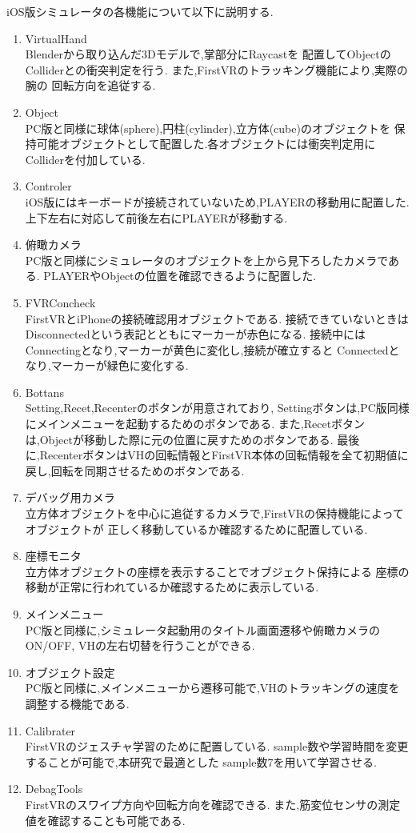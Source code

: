 \documentclass{ltjsreport}
\begin{document}
		iOS版シミュレータの各機能について以下に説明する.
		\begin{enumerate}
			\item VirtualHand\\
				Blenderから取り込んだ3Dモデルで,掌部分にRaycastを
				配置してObjectのColliderとの衝突判定を行う.
				また,FirstVRのトラッキング機能により,実際の腕の
				回転方向を追従する.
			\item Object\\
				PC版と同様に球体(sphere),円柱(cylinder),立方体(cube)のオブジェクトを
				保持可能オブジェクトとして配置した.各オブジェクトには衝突判定用にColliderを付加している.
			\item Controler\\
				iOS版にはキーボードが接続されていないため,PLAYERの移動用に配置した.
				上下左右に対応して前後左右にPLAYERが移動する.
			\item 俯瞰カメラ\\
				PC版と同様にシミュレータのオブジェクトを上から見下ろしたカメラである.
				PLAYERやObjectの位置を確認できるように配置した.
			\item FVRConcheck\\
				FirstVRとiPhoneの接続確認用オブジェクトである.
				接続できていないときはDisconnectedという表記とともにマーカーが赤色になる.
				接続中にはConnectingとなり,マーカーが黄色に変化し,接続が確立すると
				Connectedとなり,マーカーが緑色に変化する.
			\item Bottans\\
				Setting,Recet,Recenterのボタンが用意されており,
				Settingボタンは,PC版同様にメインメニューを起動するためのボタンである.
				また,Recetボタンは,Objectが移動した際に元の位置に戻すためのボタンである.
				最後に,RecenterボタンはVHの回転情報とFirstVR本体の回転情報を全て初期値に戻し,回転を同期させるためのボタンである.
			\item デバッグ用カメラ\\
				立方体オブジェクトを中心に追従するカメラで,FirstVRの保持機能によってオブジェクトが
				正しく移動しているか確認するために配置している.
			\item 座標モニタ\\
				立方体オブジェクトの座標を表示することでオブジェクト保持による
				座標の移動が正常に行われているか確認するために表示している.
			\item メインメニュー\\
				PC版と同様に,シミュレータ起動用のタイトル画面遷移や俯瞰カメラのON/OFF,
				VHの左右切替を行うことができる.
			\item オブジェクト設定\\
				PC版と同様に,メインメニューから遷移可能で,VHのトラッキングの速度を調整する機能である.
			\item Calibrater\\
				FirstVRのジェスチャ学習のために配置している.
				sample数や学習時間を変更することが可能で,本研究で最適とした
				sample数7を用いて学習させる.
			\item DebagTools\\
				FirstVRのスワイプ方向や回転方向を確認できる.
				また,筋変位センサの測定値を確認することも可能である.
		\end{enumerate}
\end{document}
